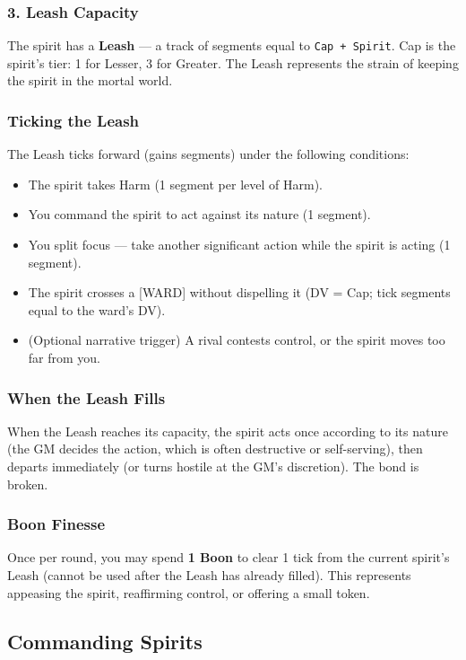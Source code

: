 \subsubsection{3. Leash Capacity}
The spirit has a \textbf{Leash} --- a track of segments equal to \texttt{Cap + Spirit}. Cap is the spirit's tier: 1 for Lesser, 3 for Greater. The Leash represents the strain of keeping the spirit in the mortal world.

\subsubsection{Ticking the Leash}
The Leash ticks forward (gains segments) under the following conditions:
\begin{itemize}
  \item The spirit takes Harm (1 segment per level of Harm).
  \item You command the spirit to act against its nature (1 segment).
  \item You split focus --- take another significant action while the spirit is acting (1 segment).
  \item The spirit crosses a [WARD] without dispelling it (DV = Cap; tick segments equal to the ward's DV).
  \item (Optional narrative trigger) A rival contests control, or the spirit moves too far from you.
\end{itemize}

\subsubsection{When the Leash Fills}
When the Leash reaches its capacity, the spirit acts once according to its nature (the GM decides the action, which is often destructive or self-serving), then departs immediately (or turns hostile at the GM's discretion). The bond is broken.

\subsubsection{Boon Finesse}
Once per round, you may spend \textbf{1 Boon} to clear 1 tick from the current spirit's Leash (cannot be used after the Leash has already filled). This represents appeasing the spirit, reaffirming control, or offering a small token.

\subsection{Commanding Spirits}

